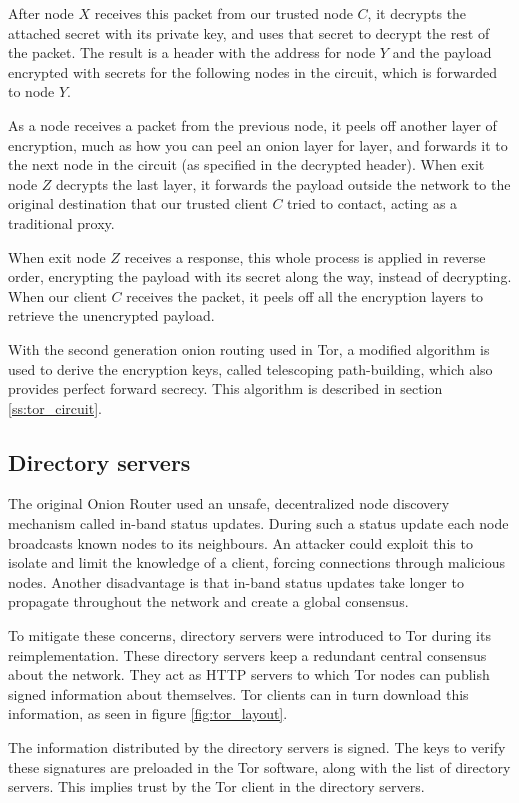 \documentclass{article}
\begin{document}
		After node $X$ receives this packet from our trusted node $C$, it decrypts the attached secret with its private key, and uses that secret to decrypt the rest of the packet. The result is a header with the address for node $Y$ and the payload encrypted with secrets for the following nodes in the circuit, which is forwarded to node $Y$.
		
		As a node receives a packet from the previous node, it peels off another layer of encryption, much as how you can peel an onion layer for layer, and forwards it to the next node in the circuit (as specified in the decrypted header). When exit node $Z$ decrypts the last layer, it forwards the payload outside the network to the original destination that our trusted client $C$ tried to contact, acting as a traditional proxy.
		
		When exit node $Z$ receives a response, this whole process is applied in reverse order, encrypting the payload with its secret along the way, instead of decrypting. When our client $C$ receives the packet, it peels off all the encryption layers to retrieve the unencrypted payload.
		
		With the second generation onion routing used in Tor, a modified algorithm is used to derive the encryption keys, called telescoping path-building, which also provides perfect forward secrecy. This algorithm is described in section \ref{ss:tor_circuit}.
		
	\subsection{Directory servers}
		The original Onion Router used an unsafe, decentralized node discovery mechanism called in-band status updates. During such a status update each node broadcasts known nodes to its neighbours. An attacker could exploit this to isolate and limit the knowledge of a client, forcing connections through malicious nodes. Another disadvantage is that in-band status updates take longer to propagate throughout the network and create a global consensus.
					
		To mitigate these concerns, directory servers were introduced to Tor during its reimplementation. These directory servers keep a redundant central consensus about the network. They act as HTTP servers to which Tor nodes can publish signed information about themselves. Tor clients can in turn download this information, as seen in figure \ref{fig:tor_layout}.
					
		The information distributed by the directory servers is signed. The keys to verify these signatures are preloaded in the Tor software, along with the list of directory servers. This implies trust by the Tor client in the directory servers.
\end{document}
